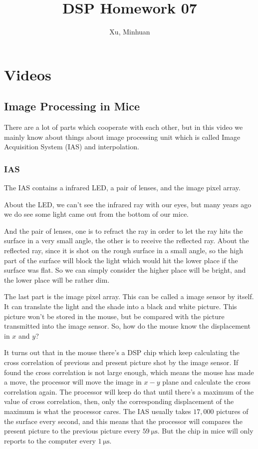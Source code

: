 \documentclass{article}
\begin{document}
\title{DSP Homework 07}
\author{Xu, Minhuan}
\maketitle
\tableofcontents
\begin{abstract}

\end{abstract}

\section{Videos}
\subsection{Image Processing in Mice}
There are a lot of parts which cooperate with each other, but in this video we mainly know about things about image processing unit which is called Image Acquisition System (IAS) and interpolation.

\subsubsection{IAS}

The IAS contains a infrared LED, a pair of lenses, and the image pixel array. 

About the LED, we can't see the infrared ray with our eyes, but many years ago we do see some light came out from the bottom of our mice.

And the pair of lenses, one is to refract the ray in order to let the ray hits the surface in a very small angle, the other is to receive the reflected ray. About the reflected ray, since it is shot on the rough surface in a small angle, so the high part of the surface will block the light which would hit the lower place if the surface was flat. So we can simply consider the higher place will be bright, and the lower place will be rather dim.

The last part is the image pixel array. This can be called a image sensor by itself. It can translate the light and the shade into a black and white picture. This picture won't be stored in the mouse, but be compared with the picture transmitted into the image sensor. So, how do the mouse know the displacement in $x$ and $y$?

It turns out that in the mouse there's a DSP chip which keep calculating the cross correlation of previous and present picture shot by the image sensor. If found the cross correlation is not large enough, which means the mouse has made a move, the processor will move the image in $x-y$ plane and calculate the cross correlation again. The processor will keep do that until there's a maximum of the value of cross correlation, then, only the corresponding displacement of the maximum is what the processor cares. The IAS usually takes $17,000$ pictures of the surface every second, and this means that the processor will compares the present picture to the previous picture every $59 ~\mathrm{\mu s}$. But the chip in mice will only reports to the computer every $1 ~\mathrm{\mu s}$.
\end{document}
